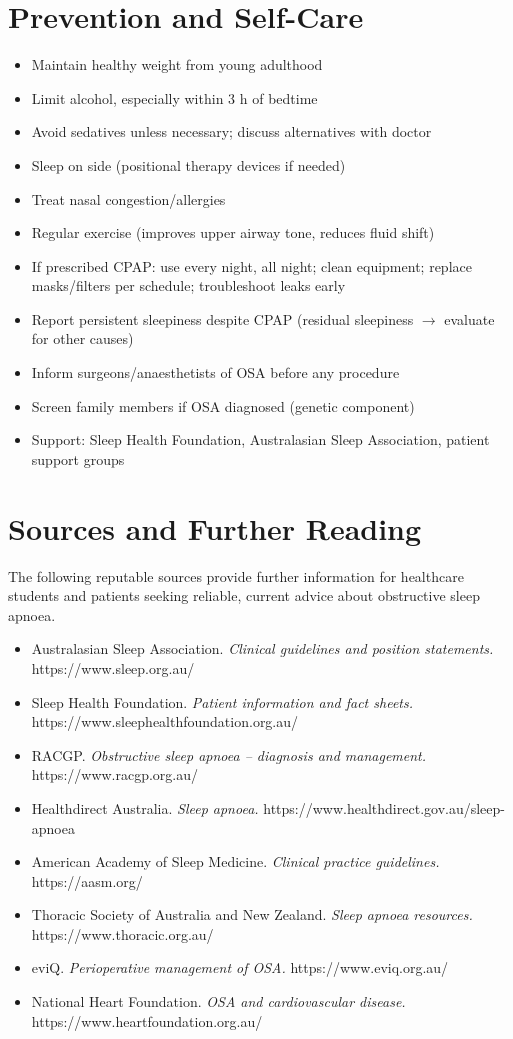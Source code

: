 \section*{Prevention and Self-Care}
\begin{itemize}
    \item Maintain healthy weight from young adulthood
    \item Limit alcohol, especially within 3 h of bedtime
    \item Avoid sedatives unless necessary; discuss alternatives with doctor
    \item Sleep on side (positional therapy devices if needed)
    \item Treat nasal congestion/allergies
    \item Regular exercise (improves upper airway tone, reduces fluid shift)
    \item If prescribed CPAP: use every night, all night; clean equipment; replace masks/filters per schedule; troubleshoot leaks early
    \item Report persistent sleepiness despite CPAP (residual sleepiness $\to$ evaluate for other causes)
    \item Inform surgeons/anaesthetists of OSA before any procedure
    \item Screen family members if OSA diagnosed (genetic component)
    \item Support: Sleep Health Foundation, Australasian Sleep Association, patient support groups
\end{itemize}

\section*{Sources and Further Reading}
The following reputable sources provide further information for healthcare students and patients seeking reliable, current advice about obstructive sleep apnoea.

\begin{itemize}
    \item Australasian Sleep Association. \textit{Clinical guidelines and position statements.} https://www.sleep.org.au/
    \item Sleep Health Foundation. \textit{Patient information and fact sheets.} https://www.sleephealthfoundation.org.au/
    \item RACGP. \textit{Obstructive sleep apnoea -- diagnosis and management.} https://www.racgp.org.au/
    \item Healthdirect Australia. \textit{Sleep apnoea.} https://www.healthdirect.gov.au/sleep-apnoea
    \item American Academy of Sleep Medicine. \textit{Clinical practice guidelines.} https://aasm.org/
    \item Thoracic Society of Australia and New Zealand. \textit{Sleep apnoea resources.} https://www.thoracic.org.au/
    \item eviQ. \textit{Perioperative management of OSA.} https://www.eviq.org.au/
    \item National Heart Foundation. \textit{OSA and cardiovascular disease.} https://www.heartfoundation.org.au/
\end{itemize}